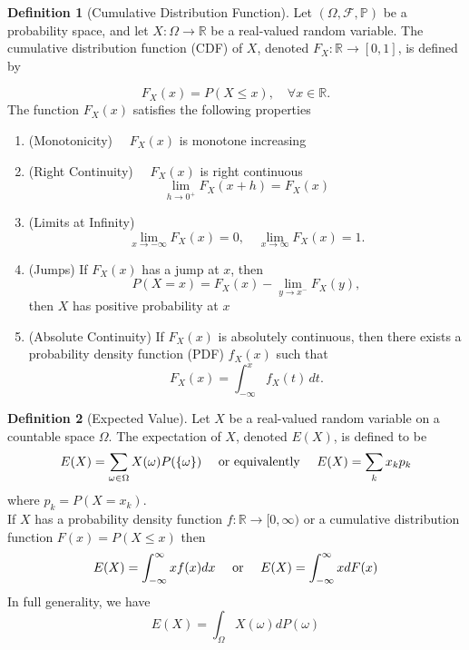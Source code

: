 \documentclass{article}
\theoremstyle{definition}
\newtheorem{definition}{Definition}[section]
\theoremstyle{remark}
\begin{document}
\begin{definition}[Cumulative Distribution Function]\label{def:cdf}
Let \( (\Omega, \mathcal{F}, \mathbb{P}) \) be a probability space, and let \( X: \Omega \to \mathbb{R} \) be a real-valued random variable. The cumulative distribution function (CDF) of \( X \), denoted \( F_X: \mathbb{R} \to [0,1] \), is defined by  

\[
F_X(x) = P(X \leq x), \quad \forall x \in \mathbb{R}.
\]
The function \( F_X(x) \) satisfies the following properties  
\begin{enumerate}
\item (Monotonicity) $\quad F_X(x)$ is monotone increasing
\item (Right Continuity) $\quad F_X(x)$ is right continuous\[
\lim_{h\to 0^+} F_X(x+h) = F_X(x)
\]
\item (Limits at Infinity) \[
\lim_{x \to -\infty} F_X(x) = 0, \quad \lim_{x \to \infty} F_X(x) = 1.
\]  
\item (Jumps) If \( F_X(x) \) has a jump at \( x \), then 
\[
P(X = x) = F_X(x) - \lim_{y \to x^-} F_X(y),
\]  
then \( X \) has positive probability at \( x \)
\item (Absolute Continuity) If \( F_X(x) \) is absolutely continuous, then there exists a probability density function (PDF) \( f_X(x) \) such that  
\[
F_X(x) = \int_{-\infty}^{x} f_X(t) \, dt.
\]  
\end{enumerate} 
\end{definition}











\begin{definition}[Expected Value]\label{def:expected value}
Let $X$ be a real-valued random variable on a countable space $\Omega$. The expectation of $X$, denoted $E(X)$, is defined to be 
\[
E(X) = \sum_{\omega \in \Omega}{X(\omega)P(\{\omega\})} \quad \textnormal{ or equivalently } \quad E(X) = \sum_k{x_kp_k}
\]
where $p_k = P(X=x_k)$.\\
If $X$ has a probability density function $f: \mathbb{R} \to [0, \infty)$ or a cumulative 
distribution function $F(x) = P(X \leq x)$ then
\[
E(X) = \int_{-\infty}^{\infty}{xf(x)dx} \quad \textnormal{ or } \quad E(X) = \int_{-\infty}^{\infty}{xdF(x)}
\]
In full generality, we have 
\[
E(X) = \int_\Omega{X(\omega)dP(\omega)}
\]
\end{definition}
\end{document}
